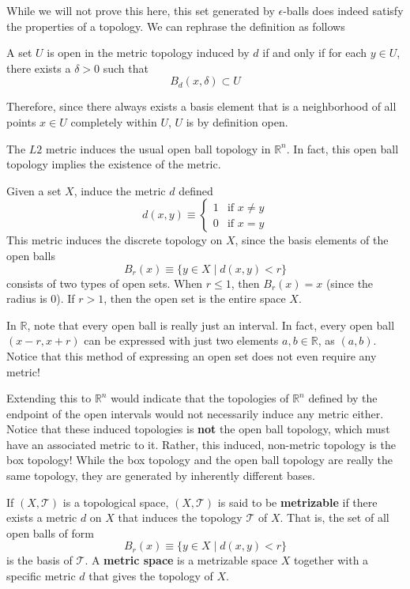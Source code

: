   While we will not prove this here, this set generated by $\epsilon$-balls does indeed satisfy the properties of a topology. We can rephrase the definition as follows 

  \begin{definition}
  A set $U$ is open in the metric topology induced by $d$ if and only if for each $y \in U$, there exists a $\delta > 0$ such that 
  \[B_d (x, \delta) \subset U\]
  \end{definition}
  Therefore, since there always exists a basis element that is a neighborhood of all points $x \in U$ completely within $U$, $U$ is by definition open. 

  \begin{example}
  The $L2$ metric induces the usual open ball topology in $\mathbb{R}^n$. In fact, this open ball topology implies the existence of the metric. 
  \end{example}

  \begin{example}
  Given a set $X$, induce the metric $d$ defined
  \[d(x, y) \equiv \begin{cases}
        1 & \text{if } x \neq y \\
        0 & \text{if } x = y
  \end{cases}\]
  This metric induces the discrete topology on $X$, since the basis elements of the open balls
  \[B_r (x) \equiv \{ y \in X \; | \; d(x, y) <r\}\]
  consists of two types of open sets. When $r \leq 1$, then $B_r (x) = x$ (since the radius is $0$). If $r > 1$, then the open set is the entire space $X$. 
  \end{example}

  In $\mathbb{R}$, note that every open ball is really just an interval. In fact, every open ball $(x - r, x + r)$ can be expressed with just two elements $a, b \in \mathbb{R}$, as $(a, b)$. Notice that this method of expressing an open set does not even require any metric! 

  Extending this to $\mathbb{R}^n$ would indicate that the topologies of $\mathbb{R}^n$ defined by the endpoint of the open intervals would not necessarily induce any metric either. Notice that these induced topologies is \textbf{not} the open ball topology, which must have an associated metric to it. Rather, this induced, non-metric topology is the box topology! While the box topology and the open ball topology are really the same topology, they are generated by inherently different bases. 

  \begin{definition}
  If $(X, \mathscr{T})$ is a topological space, $(X, \mathscr{T})$ is said to be \textbf{metrizable} if there exists a metric $d$ on $X$ that induces the topology $\mathscr{T}$ of $X$. That is, the set of all open balls of form
  \[B_r (x) \equiv \{ y \in X \; | \; d(x, y) < r \}\]
  is the basis of $\mathscr{T}$. A \textbf{metric space} is a metrizable space $X$ together with a specific metric $d$ that gives the topology of $X$. 
  \end{definition}

